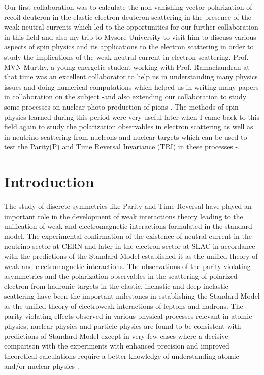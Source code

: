    Our first collaboration was to calculate the  non vanishing vector polarization of recoil deuteron in the elastic electron  deuteron   scattering in the presence of the weak neutral currents \cite{key6} which led to the opportunities for our further collaboration in this field and also my trip to Mysore University  to visit him to discuss various aspects of spin physics and its applications to the electron scattering in order to study the implications of the weak neutral current  in electron scattering. Prof. MVN Murthy, a young energetic student working with Prof. Ramachandran at that time was an excellent collaborator to help us in understanding many physics issues and doing numerical computations which helped us in writing many papers in collaboration on the subject \cite{key7}-\cite{key9}and also extending our collaboration to study some processes on nuclear  photo-production of pions \cite{key10}. The methods of spin physics learned during this period were very useful later when I came back to this field again to study the polarization observables in electron scattering as well as in neutrino scattering from nucleons and nuclear targets which can be used to test the Parity(P) and Time Reversal Invariance (TRI) in these processes \cite{key11}-\cite{key15}.


  \section{Introduction}\label{chap9-sec2}
  
   The study of discrete symmetries like Parity and Time Reversal have played an important role in the development of weak interactions theory leading to the unification of weak and electromagnetic interactions formulated in the standard model. The experimental confirmation of the existence of neutral current in the neutrino sector at CERN and later in the electron sector at SLAC in accordance with the predictions of the Standard Model  established it as the unified theory of weak and electromagnetic interactions.  The observations of the parity violating  asymmetries and the polarization observables in the scattering of polarized electron from  hadronic targets in the elastic,  inelastic and deep inelastic  scattering have been the important   milestones in establishing the Standard Model  as the unified theory of electroweak interactions  of  leptons and hadrons.  The parity violating effects observed in various physical processes relevant in atomic physics,  nuclear physics and particle physics are found to be consistent with  predictions of Standard Model except in very few cases where a decisive comparison with the experiments with  enhanced  precision and improved theoretical calculations require a better knowledge of  understanding atomic and/or nuclear physics \cite{key16}.
   
